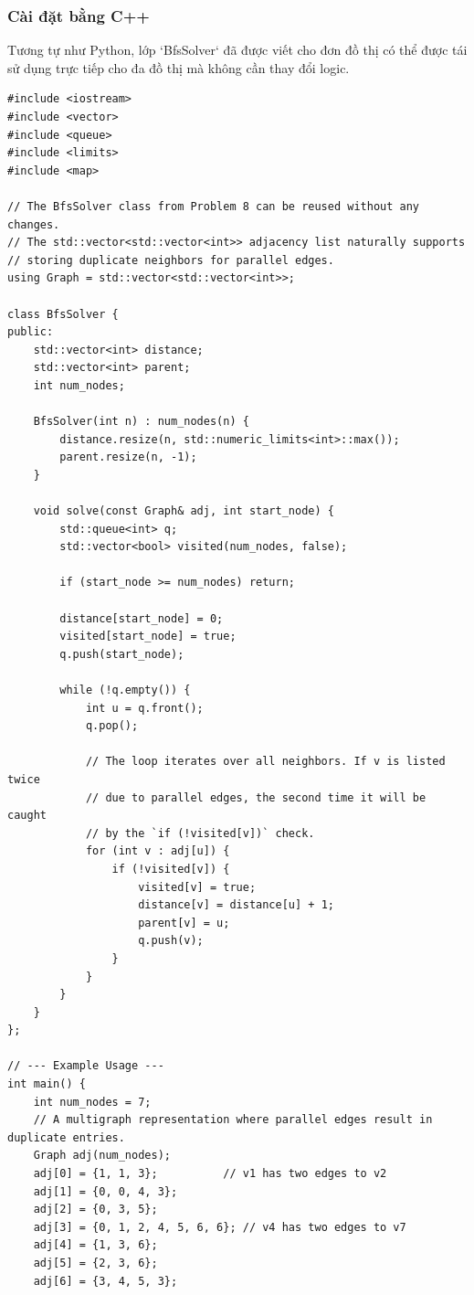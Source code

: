 \documentclass[a4paper,12pt]{article}
\begin{document}
\subsubsection{Cài đặt bằng C++}
Tương tự như Python, lớp `BfsSolver` đã được viết cho đơn đồ thị có thể được tái sử dụng trực tiếp cho đa đồ thị mà không cần thay đổi logic.
\begin{lstlisting}[style=cppstyle, caption={Cài đặt BFS cho đa đồ thị trong C++.}, label={lst:cpp_bfs_9_full}]
#include <iostream>
#include <vector>
#include <queue>
#include <limits>
#include <map>

// The BfsSolver class from Problem 8 can be reused without any changes.
// The std::vector<std::vector<int>> adjacency list naturally supports
// storing duplicate neighbors for parallel edges.
using Graph = std::vector<std::vector<int>>;

class BfsSolver {
public:
    std::vector<int> distance;
    std::vector<int> parent;
    int num_nodes;

    BfsSolver(int n) : num_nodes(n) {
        distance.resize(n, std::numeric_limits<int>::max());
        parent.resize(n, -1);
    }

    void solve(const Graph& adj, int start_node) {
        std::queue<int> q;
        std::vector<bool> visited(num_nodes, false);

        if (start_node >= num_nodes) return;

        distance[start_node] = 0;
        visited[start_node] = true;
        q.push(start_node);

        while (!q.empty()) {
            int u = q.front();
            q.pop();

            // The loop iterates over all neighbors. If v is listed twice
            // due to parallel edges, the second time it will be caught
            // by the `if (!visited[v])` check.
            for (int v : adj[u]) {
                if (!visited[v]) {
                    visited[v] = true;
                    distance[v] = distance[u] + 1;
                    parent[v] = u;
                    q.push(v);
                }
            }
        }
    }
};

// --- Example Usage ---
int main() {
    int num_nodes = 7;
    // A multigraph representation where parallel edges result in duplicate entries.
    Graph adj(num_nodes);
    adj[0] = {1, 1, 3};          // v1 has two edges to v2
    adj[1] = {0, 0, 4, 3};
    adj[2] = {0, 3, 5};
    adj[3] = {0, 1, 2, 4, 5, 6, 6}; // v4 has two edges to v7
    adj[4] = {1, 3, 6};
    adj[5] = {2, 3, 6};
    adj[6] = {3, 4, 5, 3};


\end{lstlisting}
\end{document}
